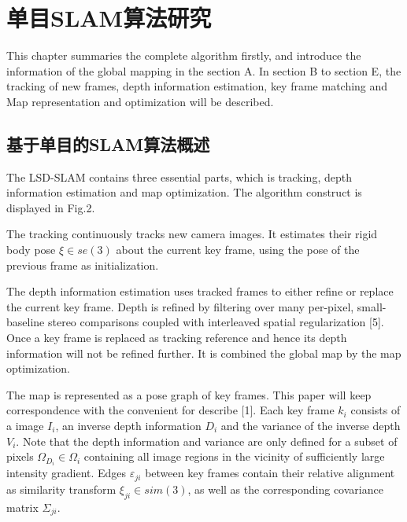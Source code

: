 
\chapter{单目SLAM算法研究}
\label{chap:ALGORITHM}
This chapter summaries the complete algorithm firstly, and introduce the information of the global mapping in the section A. In section B to section E, the tracking of new frames, depth information estimation, key frame matching and Map representation and optimization will be described.


\section{基于单目的SLAM算法概述}

The LSD-SLAM contains three essential parts, which is tracking, depth information estimation and map optimization. The algorithm construct is displayed in Fig.2.

The tracking continuously tracks new camera images. It estimates their rigid body pose $\xi  \in se(3)$ about the current key frame, using the pose of the previous frame as initialization.

The depth information estimation uses tracked frames to either refine or replace the current key frame. Depth is refined by filtering over many per-pixel, small-baseline stereo comparisons coupled with interleaved spatial regularization [5]. Once a key frame is replaced as tracking reference and hence its depth information will not be refined further. It is combined the global map by the map optimization.

The map is represented as a pose graph of key frames. This paper will keep correspondence with the convenient for describe [1]. Each key frame ${k_i}$ consists of a image ${I_i}$, an inverse depth information ${D_i}$ and the variance of the inverse depth ${V_i}$. Note that the depth information and variance are only defined for a subset of pixels ${\Omega _{{D_i}}} \in {\Omega _i}$ containing all image regions in the vicinity of sufficiently large intensity gradient. Edges ${\varepsilon _{ji}}$ between key frames contain their relative alignment as similarity transform ${\xi _{ji}} \in sim(3)$, as well as the corresponding covariance matrix ${\Sigma _{ji}}$.

